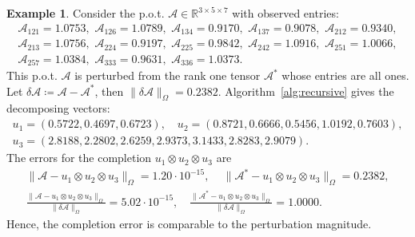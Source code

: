 \documentclass{amsart}
\newcommand{\re}{\mathbb{R}}
\newcommand{\dt}{\delta}
\newcommand{\mc}[1]{\mathcal{#1}}
\newcommand{\baray}{\begin{array}}
\newcommand{\earay}{\end{array}}
\theoremstyle{definition}
\newtheorem{example}[theorem]{Example}
\numberwithin{equation}{section}
\begin{document}
\begin{example}
Consider the p.o.t. $\mc{A} \in \re^{3 \times 5 \times 7}$ with observed entries:
\[
\baray{l}
\mc{A}_{121} = 1.0753, 
\,\, \mc{A}_{126} = 1.0789, 
\,\, \mc{A}_{134} = 0.9170,
\,\, \mc{A}_{137} = 0.9078, 
\,\, \mc{A}_{212} = 0.9340, \\
\mc{A}_{213} = 1.0756, 
\,\, \mc{A}_{224} = 0.9197,
\,\, \mc{A}_{225} = 0.9842,
\,\, \mc{A}_{242} = 1.0916, 
\,\, \mc{A}_{251} = 1.0066, \\
\mc{A}_{257} = 1.0384,
\,\, \mc{A}_{333} = 0.9631, 
\,\, \mc{A}_{336} = 1.0373.
\earay
\]
This p.o.t. $\mc{A}$ is perturbed from the rank one tensor $\mc{A}^*$ whose entries are all ones.
Let $\dt\mc{A} \coloneqq \mc{A} - \mc{A}^*$, then
$
\|\dt\mc{A}\|_{\Omega}= 0.2382.
$
Algorithm~\ref{alg:recursive} gives the decomposing vectors:
\[
\baray{l}
u_1 = (0.5722,
0.4697,
0.6723),
\quad u_2 = (0.8721,
0.6666,
0.5456,
1.0192,
0.7603), \\
u_3 = (2.8188,
2.2802,
2.6259,
2.9373,
3.1433,
2.8283,
2.9079).
\earay
\]
The errors for the completion $u_1 \otimes u_2  \otimes u_3$ are
\[
\begin{gathered}
\|\mc{A} - u_1 \otimes u_2  \otimes u_3 \|_{\Omega} = 1.20 \cdot 10^{-15}, 
\,\quad \|\mc{A}^* - u_1 \otimes u_2  \otimes u_3 \|_{\Omega} = 0.2382, \\
\frac{\|\mc{A} - u_1 \otimes u_2  \otimes u_3 \|_{\Omega}}{\|\dt\mc{A}\|_{\Omega}} = 5.02 \cdot 10^{-15},
\quad
\frac{\|\mc{A}^* - u_1 \otimes u_2  \otimes u_3 \|_{\Omega}}{\|\dt\mc{A}\|_{\Omega}} = 1.0000.
\end{gathered}
\]
Hence, the completion error is comparable to the perturbation magnitude.
\end{example}
\end{document}
